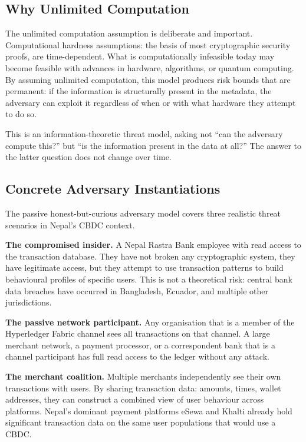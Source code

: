 \subsection{Why Unlimited Computation}

The unlimited computation assumption is deliberate and
important. Computational hardness assumptions: the basis
of most cryptographic security proofs, are time-dependent.
What is computationally infeasible today may become feasible
with advances in hardware, algorithms, or quantum computing.
By assuming unlimited computation, this model produces
risk bounds that are permanent: if the information is
structurally present in the metadata, the adversary can
exploit it regardless of when or with what hardware they
attempt to do so.

This is an information-theoretic threat model, asking not
``can the adversary compute this?'' but ``is the information
present in the data at all?'' The answer to the latter
question does not change over time.

\subsection{Concrete Adversary Instantiations}

The passive honest-but-curious adversary model covers three
realistic threat scenarios in Nepal's CBDC context.

\textbf{The compromised insider.} A Nepal Rastra Bank
employee with read access to the transaction database. They
have not broken any cryptographic system, they have
legitimate access, but they attempt to use transaction
patterns to build behavioural profiles of specific users.
This is not a theoretical risk: central bank data breaches
have occurred in Bangladesh, Ecuador, and multiple other
jurisdictions.

\textbf{The passive network participant.} Any organisation
that is a member of the Hyperledger Fabric channel sees all
transactions on that channel. A large merchant network,
a payment processor, or a correspondent bank that is a
channel participant has full read access to the ledger
without any attack.

\textbf{The merchant coalition.} Multiple merchants
independently see their own transactions with users. By
sharing transaction data: amounts, times, wallet
addresses, they can construct a combined view of user
behaviour across platforms. Nepal's dominant payment
platforms eSewa and Khalti already hold significant
transaction data on the same user populations that would
use a CBDC.

